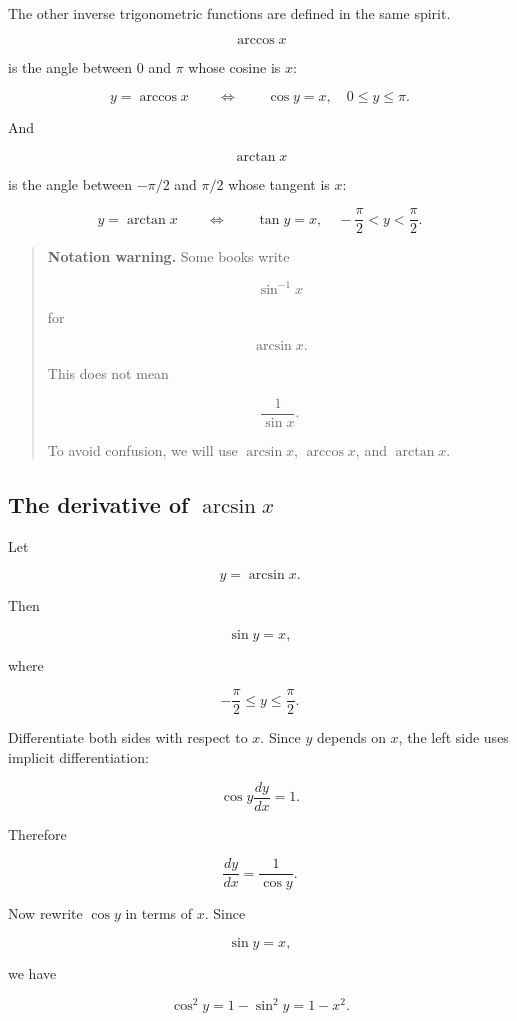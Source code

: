 The other inverse trigonometric functions are defined in the same spirit.

\[
\arccos x
\]

is the angle between \(0\) and \(\pi\) whose cosine is \(x\):

\[
y=\arccos x
\qquad\Longleftrightarrow\qquad
\cos y=x,
\quad
0\le y\le\pi.
\]

And

\[
\arctan x
\]

is the angle between \(-\pi/2\) and \(\pi/2\) whose tangent is \(x\):

\[
y=\arctan x
\qquad\Longleftrightarrow\qquad
\tan y=x,
\quad
-\frac{\pi}{2}< y<\frac{\pi}{2}.
\]

\begin{quote}
\textbf{Notation warning.}
Some books write

\[
\sin^{-1}x
\]

for

\[
\arcsin x.
\]

This does not mean

\[
\frac1{\sin x}.
\]

To avoid confusion, we will use \(\arcsin x\), \(\arccos x\), and \(\arctan x\).
\end{quote}

\subsection{The derivative of \texorpdfstring{\(\arcsin x\)}{arcsin x}}
\label{subsec:derivative-arcsin}

Let

\[
y=\arcsin x.
\]

Then

\[
\sin y=x,
\]

where

\[
-\frac{\pi}{2}\le y\le \frac{\pi}{2}.
\]

Differentiate both sides with respect to \(x\).  Since \(y\) depends on \(x\), the left side uses implicit differentiation:

\[
\cos y\frac{dy}{dx}=1.
\]

Therefore

\[
\frac{dy}{dx}=\frac1{\cos y}.
\]

Now rewrite \(\cos y\) in terms of \(x\).  Since

\[
\sin y=x,
\]

we have

\[
\cos^2y=1-\sin^2y=1-x^2.
\]


